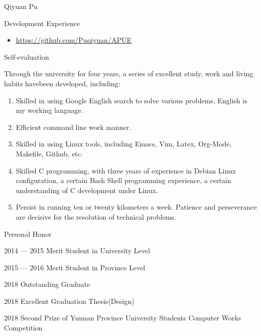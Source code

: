 \documentclass{wx672article} %
\begin{document}
\begin{cv}{Qiyuan Pu}
\begin{cvlist}{Development Experience}
    \begin{itemize}
    \item \url{https://github.com/Puqiyuan/APUE}
    \end{itemize}
  \end{cvlist}
  \begin{cvlist}{Self-evaluation}
  \item[] Through the university for four years, a series of excellent study, work and
    living habits havebeen developed, including:
    \begin{enumerate}
    \item Skilled in using Google English search to solve various problems, English is my working language.
    \item Efficient command line work manner.
    \item Skilled in using Linux tools, including Emacs, Vim, Latex, Org-Mode,
      Makefile, Github, etc.
    \item Skilled C programming, with three years of experience in Debian Linux
      configuration, a certain Bash Shell programming experience, a certain understanding
      of C development under Linux.
    \item Persist in running ten or twenty kilometers a week. Patience and perseverance
      are decisive for the resolution of technical problems.
    \end{enumerate}
  \end{cvlist}
  \begin{cvlist}{Personal Honor}
  \item[2014 — 2015] Merit Student in University Level
  \item[2015 — 2016] Merit Student in Province Level
  \item[2018] Outstanding Graduate
  \item[2018] Excellent Graduation Thesis(Design)
  \item[2018] Second Prize of Yunnan Province University Students Computer Works
    Competition
  \end{cvlist}
\end{cv}
\end{document}

